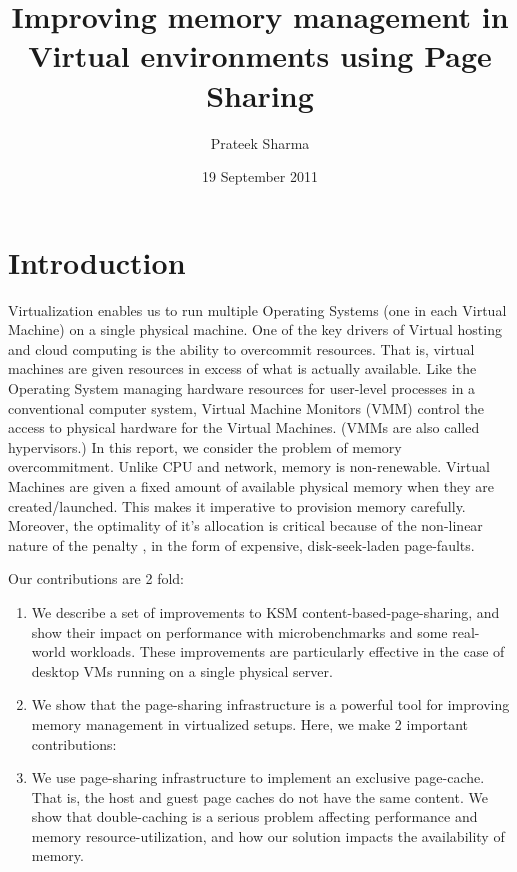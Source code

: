 \documentclass[10pt,a4paper]{article}
\title{Improving memory management in Virtual environments using Page Sharing}
\author{Prateek Sharma}
\date{19 September 2011}
\begin{document}
\maketitle


\section{Introduction}

Virtualization enables us to run multiple Operating Systems (one in each Virtual Machine) on a single physical machine. One of the key drivers of Virtual hosting and cloud computing is the ability to overcommit resources. That is, virtual machines are given resources in excess of what is actually available.
Like the Operating System managing hardware resources for user-level processes in a conventional computer system, Virtual Machine Monitors (VMM) control the access to physical hardware for the Virtual Machines. (VMMs are also called hypervisors.)
In this report, we consider the problem of memory overcommitment. Unlike CPU and network, memory is non-renewable. Virtual Machines are given a fixed amount of available physical memory when they are created/launched. This makes it imperative to provision memory carefully. Moreover, the optimality of it's allocation is critical because of the non-linear nature of the penalty , in the form of expensive, disk-seek-laden page-faults. 


Our contributions are 2 fold: 
\begin{enumerate}
\item We describe a set of improvements to KSM content-based-page-sharing, and show their impact on performance with microbenchmarks and some real-world workloads. These improvements are particularly effective in the case of desktop VMs running on a single physical server.
\item We show that the page-sharing infrastructure is a powerful tool for improving memory management in virtualized setups. Here, we make 2 important contributions:
\item We use page-sharing infrastructure to implement an exclusive page-cache. That is, the host and guest page caches do not have the same content. We show that double-caching is a serious problem affecting performance and memory resource-utilization, and how our solution impacts the availability of memory.
\end{enumerate}
\end{document}
